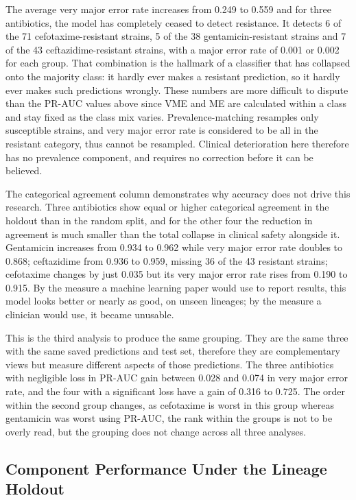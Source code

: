 \documentclass[journal]{IEEEtran}
\begin{document}
The average very major error rate increases from 0.249 to 0.559 and for three
antibiotics, the model has completely ceased to detect resistance. It detects 6 of
the 71 cefotaxime-resistant strains, 5 of the 38 gentamicin-resistant strains and 7
of the 43 ceftazidime-resistant strains, with a major error rate of 0.001 or 0.002
for each group. That combination is the hallmark of a classifier that has collapsed
onto the majority class: it hardly ever makes a resistant prediction, so it hardly
ever makes such predictions wrongly. These numbers are more difficult to dispute than
the PR-AUC values above since VME and ME are calculated within a class and stay fixed
as the class mix varies. Prevalence-matching resamples only susceptible strains, and
very major error rate is considered to be all in the resistant category, thus cannot
be resampled. Clinical deterioration here therefore has no prevalence component, and
requires no correction before it can be believed.

The categorical agreement column demonstrates why accuracy does not drive this
research. Three antibiotics show equal or higher categorical agreement in the holdout
than in the random split, and for the other four the reduction in agreement is much
smaller than the total collapse in clinical safety alongside it. Gentamicin increases
from 0.934 to 0.962 while very major error rate doubles to 0.868; ceftazidime from
0.936 to 0.959, missing 36 of the 43 resistant strains; cefotaxime changes by just
0.035 but its very major error rate rises from 0.190 to 0.915. By the measure a
machine learning paper would use to report results, this model looks better or nearly
as good, on unseen lineages; by the measure a clinician would use, it became
unusable.

This is the third analysis to produce the same grouping. They are the same three with
the same saved predictions and test set, therefore they are complementary views but
measure different aspects of those predictions. The three antibiotics with negligible
loss in PR-AUC gain between 0.028 and 0.074 in very major error rate, and the four
with a significant loss have a gain of 0.316 to 0.725. The order within the second
group changes, as cefotaxime is worst in this group whereas gentamicin was worst
using PR-AUC, the rank within the groups is not to be overly read, but the grouping
does not change across all three analyses.

\subsection{Component Performance Under the Lineage Holdout}
\end{document}
